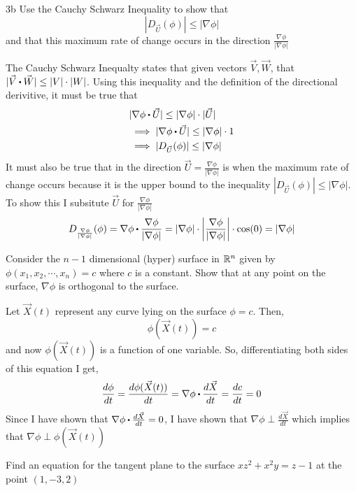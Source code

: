 \documentclass[titlepage]{article}
\begin{document}
\begin{problem}{3b}
Use the Cauchy Schwarz Inequality to show that
$$ |D_{\vec{U}}(\phi)| \leq |\nabla\phi| $$
and that this maximum rate of change occurs in the direction $\frac{\nabla\phi}{|\nabla\phi|} $
\end{problem}
\begin{solution}
The Cauchy Schwarz Inequalty states that given vectors $\vec{V}, \vec{W}$, that $|\vec{V} \bigcdot \vec{W}| \leq |V|\cdot|W|$. Using this inequality and the definition of the directional derivitive, it must be true that
\begin{align*}
&|\nabla\phi \bigcdot \vec{U}| \leq |\nabla\phi|\cdot |\vec{U}| \\
&\implies |\nabla\phi \bigcdot \vec{U}| \leq |\nabla\phi| \cdot 1\\
&\implies |D_{\vec{U}}(\phi)| \leq |\nabla\phi|
\end{align*}
It must also be true that in the direction $\vec{U} = \frac{\nabla\phi}{|\nabla\phi|}$ is when the maximum rate of change occurs because it is the upper bound to the inequality $|D_{\vec{U}}(\phi)| \leq |\nabla\phi|$. To show this I subsitute $\vec{U}$ for $\frac{\nabla\phi}{|\nabla\phi|}$
$$D_{\frac{\nabla\phi}{|\nabla\phi|}}(\phi) = \nabla\phi \bigcdot \frac{\nabla\phi}{|\nabla\phi|} = |\nabla\phi|\cdot\bigg|\frac{\nabla\phi}{|\nabla\phi|}\bigg|\cdot\cos(0)=|\nabla\phi|$$
\end{solution}

\begin{problem}{4}
Consider the $n-1$ dimensional (hyper) surface in $\mathbb{R}^n$ given by $\phi(x_1,x_2,\cdots,x_n) = c$ where $c$ is a constant. Show that at any point on the surface, $\nabla\phi$ is orthogonal to the surface.
\end{problem}

\begin{solution}
Let $\vec{X}(t)$ represent any curve lying on the surface $\phi = c$. Then,
$$\phi(\vec{X}(t)) = c$$
and now $\phi(\vec{X}(t))$ is a function of one variable. So, differentiating both sides of this equation I get,
$$\frac{d\phi}{dt}=\frac{d\phi(\vec{X}(t))}{dt}= \nabla\phi\bigcdot\frac{d\vec{X}}{dt} =\frac{dc}{dt} = 0$$
Since I have shown that $\nabla\phi \bigcdot \frac{d\vec{X}}{dt} = 0$, I have shown that $\nabla\phi \perp \frac{d\vec{X}}{dt}$ which implies that $\nabla\phi \perp \phi(\vec{X}(t))$
\end{solution}

\begin{problem}{5}
Find an equation for the tangent plane to the surface $xz^2 + x^2y = z-1$ at the point $(1,-3,2)$
\end{problem}
\end{document}
